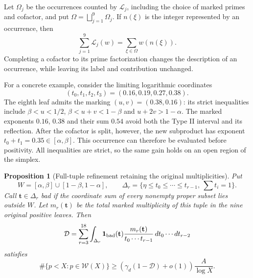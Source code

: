 \documentclass[11pt,a4paper]{article}
\theoremstyle{paperplain}
\newtheorem{proposition}[theorem]{Proposition}
\numberwithin{equation}{section}
\begin{document}
Let $\Omega_j$ be the occurrences counted by $\mathcal L_j$, including
the choice of marked primes and cofactor, and put
$\Omega=\bigsqcup_{j=1}^9\Omega_j$. If $n(\xi)$ is the integer represented
by an occurrence, then
\[
 \sum_{j=1}^9\mathcal L_j(w)=\sum_{\xi\in\Omega}w(n(\xi)).
\]
Completing a cofactor to its prime factorization changes the description
of an occurrence, while leaving its label and contribution unchanged.

For a concrete example, consider the limiting logarithmic coordinates
\[
 (t_0,t_1,t_2,t_3)=(0.16,0.19,0.27,0.38).
\]
The eighth leaf admits the marking $(u,v)=(0.38,0.16)$: its strict
inequalities include $\beta<u<1/2$, $\beta<u+v<1-\beta$ and
$u+2v>1-\alpha$. The marked exponents $0.16$, $0.38$ and their sum
$0.54$ avoid both the Type II interval and its reflection. After the
cofactor is split, however, the new subproduct has exponent
$t_0+t_1=0.35\in[\alpha,\beta]$. This occurrence can therefore be
evaluated before positivity. All inequalities are strict, so the same
gain holds on an open region of the simplex.

\begin{proposition}[Full-tuple refinement retaining the original multiplicities]\label{nine:tuple-loss}
Put
\[
 W=[\alpha,\beta]\cup[1-\beta,1-\alpha],\qquad
 \Delta_r=\{\eta\le t_0\le\cdots\le t_{r-1},\ \sum t_i=1\}.
\]
Call $\mathbf t\in\Delta_r$ bad if the coordinate sum of every nonempty proper
subset lies outside $W$.
Let $m_r(\mathbf t)$ be the total marked multiplicity of this tuple in the
nine original positive leaves.
Then
\begin{equation}\label{nine:loss-integral}
 \mathcal D=\sum_{r=3}^{18}\int_{\Delta_r}
 \mathbf1_{\rm bad}(\mathbf t)
 \frac{m_r(\mathbf t)}{t_0\cdots t_{r-1}}\,dt_0\cdots dt_{r-2}
\end{equation}
satisfies
\begin{equation}\label{nine:prime-lower-word}
 \#\{p<X:p\in\mathcal W(X)\}
 \ge\left(\gamma_d(1-\mathcal D)+o(1)\right)\frac A{\log X}.
\end{equation}
\end{proposition}
\end{document}
